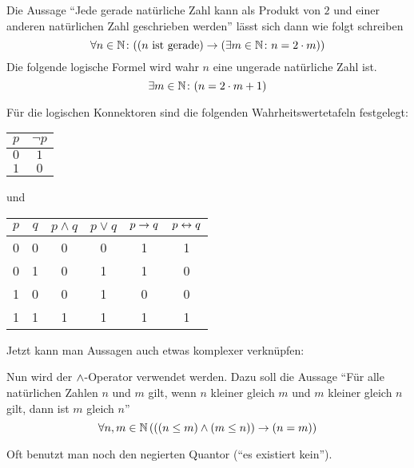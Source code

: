 \begin{example}
Die Aussage "`Jede gerade natürliche Zahl kann als Produkt von $2$ und einer
anderen natürlichen Zahl geschrieben werden"' lässt sich dann wie
folgt schreiben
\begin{displaymath}
\forall n \in \mathbb N \colon ((n \text{ ist gerade}) \rightarrow (\exists m
\in \mathbb N \colon n = 2 \cdot m)) 
\end{displaymath}
Die folgende logische Formel wird wahr \gdw $n$ eine ungerade
natürliche Zahl ist.
\begin{displaymath}
\exists m \in \mathbb N \colon (n = 2 \cdot m + 1)
\end{displaymath}
\end{example}
Für die logischen Konnektoren sind die folgenden Wahrheitswertetafeln
festgelegt:

\begin{center}
\begin{tabular}{c||c}
$p$ & $\neg p$\\
\hline
$0$ & $1$\\
$1$ & $0$
\end{tabular}
\hspace*{5em}
und
\hspace*{5em}
\begin{tabular}{c|c||c|c|c|c}
$p$ & $q$ & $p \wedge q$ & $p \vee q$ & $p \rightarrow q$ & $p \leftrightarrow q$\\
\hline
0 & 0 & 0 & 0 & 1 & 1\\   
0 & 1 & 0 & 1 & 1 & 0\\
1 & 0 & 0 & 1 & 0 & 0\\ 
1 & 1 & 1 & 1 & 1 & 1
\end{tabular}
\end{center}
Jetzt kann man Aussagen auch etwas komplexer verknüpfen:
\begin{example}
Nun wird der $\wedge$-Operator verwendet werden. Dazu soll die Aussage 
"`Für alle natürlichen Zahlen $n$ und $m$ gilt, wenn $n$ kleiner
gleich $m$ und $m$ kleiner gleich $n$ gilt, dann ist $m$ gleich $n$"'
\begin{displaymath}
\forall n,m \in \mathbb N\, (((n \le m) \wedge (m \le n)) \rightarrow (n = m))
\end{displaymath}
\end{example}
Oft benutzt man noch den negierten Quantor \dindex{$\nexists$} ("`es existiert kein"').

